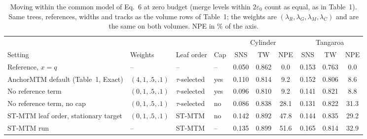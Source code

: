 \begin{table}[!htb]
\centering
\caption{Moving within the common model of Eq.~6 at zero budget (merge levels within $2\varepsilon_0$ count as equal, as in Table~1). Same trees, references, widths and tracks as the volume rows of Table~1; the weights are $(\lambda_R,\lambda_G,\lambda_M,\lambda_C)$ and are the same on both volumes. NPE in \% of the axis.}
\label{tab:family}
\footnotesize
\begin{tabular}{@{}llll ccc ccc@{}}
\toprule
 & & & & \multicolumn{3}{c}{Cylinder} & \multicolumn{3}{c}{Tangaroa} \\
\cmidrule(lr){5-7}\cmidrule(l){8-10}
Setting & Weights & Leaf order & Cap & SNS & TW & NPE & SNS & TW & NPE \\
\midrule
Reference, $x=q$ & -- & -- & -- & 0.050 & 0.862 & 0.0 & 0.153 & 0.763 & 0.0 \\
AnchorMTM default (Table~1, Exact) & $(4,1,.5,.1)$ & $\tau$-selected & yes & 0.110 & 0.814 & 9.2 & 0.152 & 0.806 & 8.6 \\
No reference term & $(0,1,.5,.1)$ & $\tau$-selected & yes & 0.096 & 0.810 & 9.2 & 0.141 & 0.821 & 8.8 \\
No reference term, no cap & $(0,1,.5,.1)$ & $\tau$-selected & no & 0.086 & 0.838 & 28.1 & 0.131 & 0.822 & 31.3 \\
ST-MTM leaf order, stationary target & $(0,1,.5,.1)$ & ST-MTM & no & 0.142 & 0.892 & 47.8 & 0.144 & 0.835 & 29.2 \\
ST-MTM run & -- & ST-MTM & -- & 0.135 & 0.899 & 51.6 & 0.165 & 0.814 & 32.9 \\
\bottomrule
\end{tabular}
\end{table}
